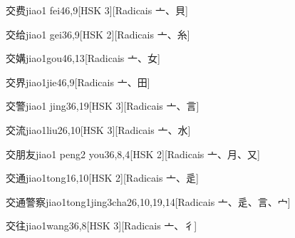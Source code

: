 \begin{entry}{交费}{jiao1 fei4}{6,9}[HSK 3][Radicais ⼇、⾙]
\end{entry}

\begin{entry}{交给}{jiao1 gei3}{6,9}[HSK 2][Radicais ⼇、⽷]
\end{entry}

\begin{entry}{交媾}{jiao1gou4}{6,13}[Radicais ⼇、⼥]
\end{entry}

\begin{entry}{交界}{jiao1jie4}{6,9}[Radicais ⼇、⽥]
\end{entry}

\begin{entry}{交警}{jiao1 jing3}{6,19}[HSK 3][Radicais ⼇、⾔]
\end{entry}

\begin{entry}{交流}{jiao1liu2}{6,10}[HSK 3][Radicais ⼇、⽔]
\end{entry}

\begin{entry}{交朋友}{jiao1 peng2 you3}{6,8,4}[HSK 2][Radicais ⼇、⽉、⼜]
\end{entry}

\begin{entry}{交通}{jiao1tong1}{6,10}[HSK 2][Radicais ⼇、⾡]
\end{entry}

\begin{entry}{交通警察}{jiao1tong1jing3cha2}{6,10,19,14}[Radicais ⼇、⾡、⾔、⼧]
\end{entry}

\begin{entry}{交往}{jiao1wang3}{6,8}[HSK 3][Radicais ⼇、⼻]
\end{entry}

